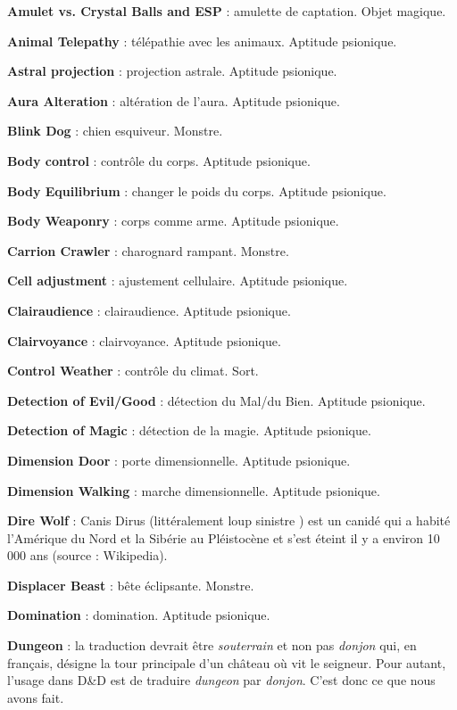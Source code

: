 \documentclass[11pt]{article}
\begin{document}
{\parindent0cm

\textbf{Amulet vs. Crystal Balls and ESP} : amulette de captation. Objet magique.

\textbf{Animal Telepathy} : télépathie avec les animaux. Aptitude psionique.

\textbf{Astral projection} : projection astrale. Aptitude psionique.

\textbf{Aura Alteration} : altération de l'aura. Aptitude psionique.

\textbf{Blink Dog} : chien esquiveur. Monstre.

\textbf{Body control} : contrôle du corps. Aptitude psionique.

\textbf{Body Equilibrium} : changer le poids du corps. Aptitude psionique.

\textbf{Body Weaponry} : corps comme arme. Aptitude psionique. %

\textbf{Carrion Crawler} : charognard rampant. Monstre.

\textbf{Cell adjustment} : ajustement cellulaire. Aptitude psionique.

\textbf{Clairaudience} : clairaudience. Aptitude psionique.

\textbf{Clairvoyance} : clairvoyance. Aptitude psionique.

\textbf{Control Weather} : contrôle du climat. Sort.

\textbf{Detection of Evil/Good} : détection du Mal/du Bien. Aptitude psionique.

\textbf{Detection of Magic} : détection de la magie. Aptitude psionique.

\textbf{Dimension Door} : porte dimensionnelle. Aptitude psionique.

\textbf{Dimension Walking} : marche dimensionnelle. Aptitude psionique.

\textbf{Dire Wolf} : Canis Dirus (littéralement \og loup sinistre \fg) est un canidé qui a habité l'Amérique du Nord et la Sibérie au Pléistocène et s’est éteint il y a environ 10 000 ans (source : Wikipedia).

\textbf{Displacer Beast} : bête éclipsante. Monstre.

\textbf{Domination} : domination. Aptitude psionique.

\textbf{Dungeon} : la traduction devrait être \textit{souterrain} et non pas \textit{donjon} qui, en français, désigne la tour principale d'un château où vit le seigneur. Pour autant, l'usage dans D\&D est de traduire \textit{dungeon} par \textit{donjon}. C'est donc ce que nous avons fait.

}
\end{document}
